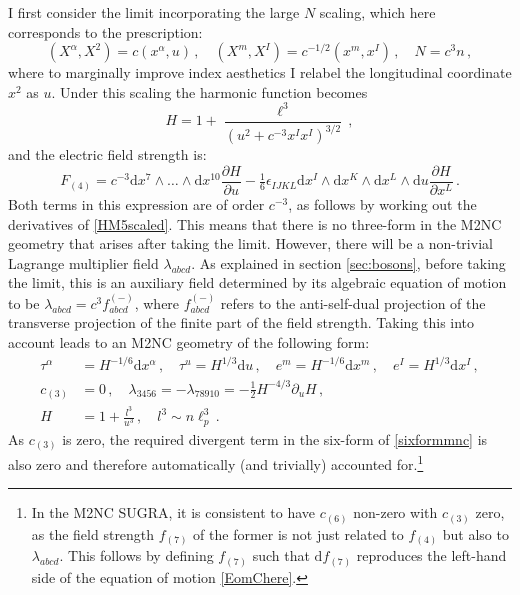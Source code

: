\documentclass[11pt]{article}
\newcommand{\be}{\begin{equation}}
\newcommand{\ee}{\end{equation}}
\newcommand{\dd}{\mathrm{d}}
\numberwithin{equation}{section}
\begin{document}
{{I first consider the limit incorporating the large $N$ scaling, which here corresponds to the prescription:
\be
(X^\alpha, X^2) = c (x^\alpha, u) \,,\quad
(X^m, X^I) = c^{-1/2} (x^m, x^I) \,,\quad
N = c^3 n \,,
\ee
where to marginally improve index aesthetics I relabel the longitudinal coordinate $x^2$ as $u$.
Under this scaling the harmonic function becomes
\be
H = 1 + \frac{\ell^3}{(u^2 + c^{-3} x^I x^I)^{3/2}} \,,
\label{HM5scaled}
\ee
and the electric field strength is: 
\be
F_{(4)} = c^{-3} \dd x^7 \wedge \dots \wedge \dd x^{10} \frac{\partial H}{\partial u} 
- \tfrac16 \epsilon_{IJKL} \dd x^I \wedge \dd x^K \wedge \dd x^L \wedge \dd u\frac{\partial H}{\partial x^L} \,.
\ee
Both terms in this expression are of order $c^{-3}$, as follows by working out the derivatives of \eqref{HM5scaled}.
This means that there is no three-form in the M2NC geometry that arises after taking the limit.
However, there will be a non-trivial Lagrange multiplier field $\lambda_{abcd}$.
As explained in section \ref{sec:bosons}, before taking the limit, this is an auxiliary field determined by its algebraic equation of motion to be $\lambda_{abcd} = c^{3} f^{(-)}_{abcd}$, where $f^{(-)}_{abcd}$ refers to the anti-self-dual projection of the transverse projection of the finite part of the field strength.
Taking this into account leads to an M2NC geometry of the following form:
\be
\begin{split} 
\tau^\alpha & = H^{-1/6} \dd x^\alpha \,,\quad \tau^u= H^{1/3} \dd u \,,\quad
e^m = H^{-1/6} \dd x^m \,,\quad e^I = H^{1/3} \dd x^I \,,\\[4pt]
c_{(3)} & = 0 \,,\quad 
\lambda_{3456}=  - \lambda_{789 10} = - \tfrac12 H^{-4/3} \partial_u H \,,\\[4pt]
H & = 1 + \frac{l^3}{u^3}\,,\quad l^3 \sim n \ell_p^3 \,.
\end{split} 
\label{M5ScaledM2NC}
\ee
As $c_{(3)}$ is zero, the required divergent term in the six-form of \eqref{sixformmnc} is also zero and therefore automatically (and trivially) accounted for.\footnote{In the M2NC SUGRA, it is consistent to have $c_{(6)}$ non-zero with $c_{(3)}$ zero, as the field strength $f_{(7)}$ of the former is not just related to $f_{(4)}$ but also to $\lambda_{abcd}$. This follows by defining $f_{(7)}$ such that $\dd f_{(7)}$ reproduces the left-hand side of the equation of motion \eqref{EomChere}.}

}}
\end{document}
